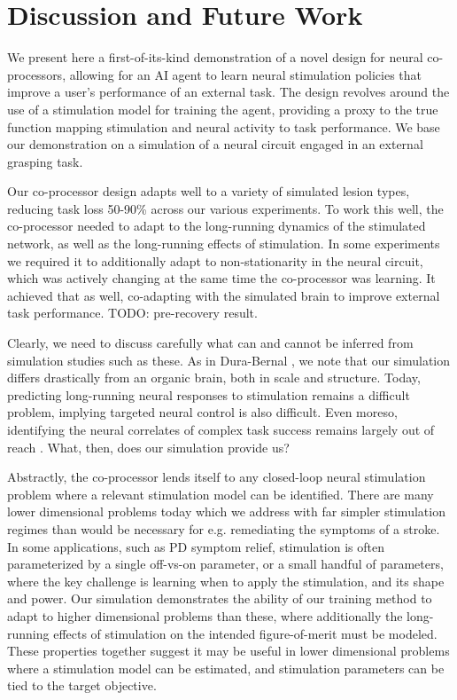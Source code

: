 \documentclass[12pt]{iopart}
\begin{document}
\section{Discussion and Future Work}
\label{sec:discussion}

We present here a first-of-its-kind demonstration of a novel design for neural co-processors,
allowing for an AI agent to learn neural stimulation policies that improve a user's performance
of an external task. The design revolves around the use of a stimulation model for training the
agent, providing a proxy to the true function mapping stimulation and neural activity
to task performance. We base our demonstration on a simulation of a neural circuit engaged in
an external grasping task.

Our co-processor design adapts well to a variety of simulated lesion types, reducing task loss
50-90\% across our various experiments. To work this well, the co-processor needed to adapt to
the long-running dynamics of the stimulated network, as well as the long-running effects of
stimulation. In some experiments we required it to additionally adapt to non-stationarity in
the neural circuit, which was actively changing at the same time the co-processor was learning.
It achieved that as well, co-adapting with the simulated brain to improve external task
performance.  TODO: pre-recovery result.

Clearly, we need to discuss carefully what can and cannot be inferred from simulation studies
such as these. As in Dura-Bernal \cite{bernal.sim}, we note that our simulation differs
drastically from an organic brain, both in scale and structure. Today, predicting long-running
neural responses to stimulation remains a difficult problem, implying targeted neural control
is also difficult. Even moreso, identifying the neural correlates of complex task success
remains largely out of reach \cite{khanna.openloop}. What, then, does our simulation provide us?

Abstractly, the co-processor lends itself to any closed-loop neural stimulation problem
where a relevant stimulation model can be identified. There are many lower dimensional problems
today which we address with far simpler stimulation regimes than would be necessary for
e.g. remediating the symptoms of a stroke. In some applications, such as PD symptom relief,
stimulation is often parameterized by a single off-vs-on parameter, or a small handful of
parameters, where the key challenge is learning when to apply the stimulation, and
its shape and power. Our simulation demonstrates the ability of our training method to adapt to
higher dimensional problems than these, where additionally the long-running effects of
stimulation on the intended figure-of-merit must be modeled. These properties together
suggest it may be useful in lower dimensional problems where a stimulation model can be
estimated, and stimulation parameters can be tied to the target objective.
\end{document}
